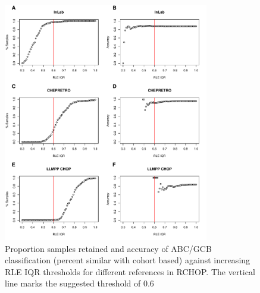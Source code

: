\begin{figure}
	\begin{center}
		\includegraphics[width=0.8\textwidth]{figures/RCHOP_rle_classification_abcgcb.pdf}
	\end{center}
	\caption{Proportion samples retained and accuracy of ABC/GCB classification (percent similar with cohort based) against increasing RLE IQR thresholds for different references in RCHOP. The vertical line marks the suggested threshold of 0.6}
	\label{fig:RCHOP_rle_clas_abcgcb}
\end{figure}

